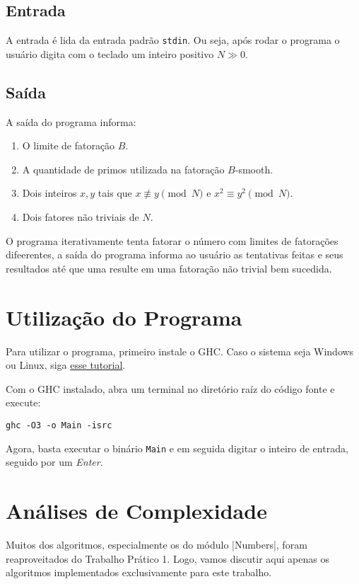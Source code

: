 \documentclass{article}
\begin{document}
\subsection{Entrada}

A entrada é lida da entrada padrão \verb|stdin|. Ou seja, após rodar o programa o usuário digita com o teclado um inteiro positivo $N \gg 0$.

\subsection{Saída}

A saída do programa informa:

\begin{enumerate}
    \item O limite de fatoração $B$.
    \item A quantidade de primos utilizada na fatoração $B$-smooth.
    \item Dois inteiros $x, y$ tais que $x \not\equiv y \pmod{N}$ e $x^2 \equiv y^2 \pmod{N}$.
    \item Dois fatores não triviais de $N$.
\end{enumerate}

O programa iterativamente tenta fatorar o número com limites de fatorações difeerentes, a saída do programa informa ao usuário as tentativas feitas e seus resultados até que uma resulte em uma fatoração não trivial bem sucedida.

\section{Utilização do Programa}

Para utilizar o programa, primeiro instale o GHC. Caso o sistema seja Windows ou Linux, siga \href{https://www.haskell.org/downloads/}{esse tutorial}.

Com o GHC instalado, abra um terminal no diretório raíz do código fonte e execute:

\verb|ghc -O3 -o Main -isrc|

Agora, basta executar o binário \verb|Main| e em seguida digitar o inteiro de entrada, seguido por um \textit{Enter}.

\section{Análises de Complexidade}

Muitos dos algoritmos, especialmente os do módulo |Numbers|, foram reaproveitados do Trabalho Prático 1. Logo, vamos discutir aqui apenas os algoritmos implementados exclusivamente para este trabalho.
\end{document}
